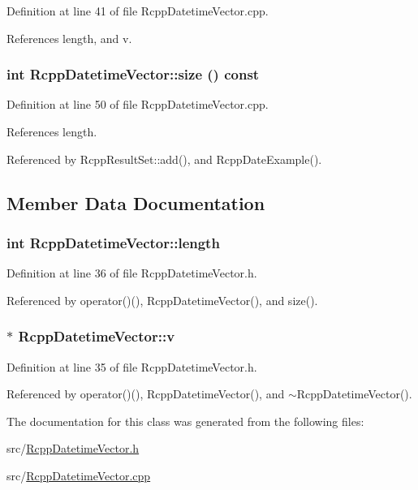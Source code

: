 Definition at line 41 of file RcppDatetimeVector.cpp.

References length, and v.\hypertarget{classRcppDatetimeVector_ab9c8683a2883c6cc3bb600d0b0682965}{
\subsubsection[{size}]{\setlength{\rightskip}{0pt plus 5cm}int RcppDatetimeVector::size () const}}
\label{classRcppDatetimeVector_ab9c8683a2883c6cc3bb600d0b0682965}


Definition at line 50 of file RcppDatetimeVector.cpp.

References length.

Referenced by RcppResultSet::add(), and RcppDateExample().

\subsection{Member Data Documentation}
\hypertarget{classRcppDatetimeVector_ae131031fcf2e65b7bfeee3d8e25c4f8c}{
\subsubsection[{length}]{\setlength{\rightskip}{0pt plus 5cm}int {\bf RcppDatetimeVector::length}}}
\label{classRcppDatetimeVector_ae131031fcf2e65b7bfeee3d8e25c4f8c}


Definition at line 36 of file RcppDatetimeVector.h.

Referenced by operator()(), RcppDatetimeVector(), and size().\hypertarget{classRcppDatetimeVector_a0138476000351892e9ec591b2c9ec02f}{
\subsubsection[{v}]{$\ast$ {\bf RcppDatetimeVector::v}}}
\label{classRcppDatetimeVector_a0138476000351892e9ec591b2c9ec02f}


Definition at line 35 of file RcppDatetimeVector.h.

Referenced by operator()(), RcppDatetimeVector(), and $\sim$RcppDatetimeVector().

The documentation for this class was generated from the following files:\begin{DoxyCompactItemize}
\item 
src/\hyperlink{RcppDatetimeVector_8h}{RcppDatetimeVector.h}\item 
src/\hyperlink{RcppDatetimeVector_8cpp}{RcppDatetimeVector.cpp}\end{DoxyCompactItemize}
